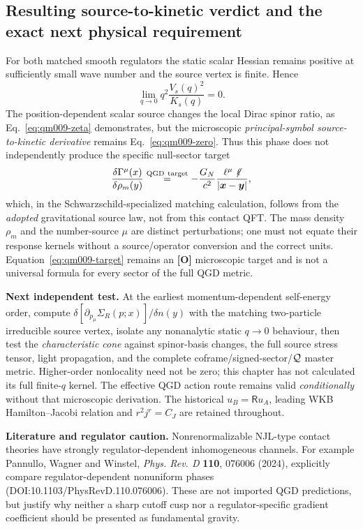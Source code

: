 \documentclass[11pt,a4paper]{article}
\begin{document}
\subsection{Resulting source-to-kinetic verdict and the exact next physical requirement}
For both matched smooth regulators the static scalar Hessian remains positive at sufficiently small wave number and the source vertex is finite. Hence
\begin{equation}\label{eq:qm009-pole}
\boxed{\lim_{q\to0}q^2\frac{V_s(q)^2}{K_s(q)}=0.}
\end{equation}
The position-dependent scalar source changes the local Dirac spinor ratio, as Eq.~\eqref{eq:qm009-zeta} demonstrates, but the microscopic \emph{principal-symbol source-to-kinetic derivative} remains Eq.~\eqref{eq:qm009-zero}. Thus this phase does not independently produce the specific null-sector target
\begin{equation}\label{eq:qm009-target}
\frac{\delta\Gamma^\mu(x)}{\delta\rho_m(y)}\stackrel{\rm QGD\ target}{=}
-\frac{G_N}{c^2}\frac{\ell^\mu\not\!\ell}{|\bm x-\bm y|},
\end{equation}
which, in the Schwarzschild-specialized matching calculation, follows from the \emph{adopted} gravitational source law, not from this contact QFT. The mass density $\rho_m$ and the number-source $\mu$ are distinct perturbations; one must not equate their response kernels without a source/operator conversion and the correct units. Equation~\eqref{eq:qm009-target} remains an \textbf{[O]} microscopic target and is not a universal formula for every sector of the full QGD metric.

\textbf{Next independent test.} At the earliest momentum-dependent self-energy order, compute $\delta[\partial_{p_\mu}\Sigma_R(p;x)]/\delta n(y)$ with the matching two-particle irreducible source vertex, isolate any nonanalytic static $q\to0$ behaviour, then test the \emph{characteristic cone} against spinor-basis changes, the full source stress tensor, light propagation, and the complete coframe/signed-sector/$\mathcal Q$ master metric. Higher-order nonlocality need not be zero; this chapter has not calculated its full finite-$q$ kernel. The effective QGD action route remains valid \emph{conditionally} without that microscopic derivation. The historical $u_B=\mathsf R u_A$, leading WKB Hamilton--Jacobi relation and $r^2j^r=C_J$ are retained throughout.

\textbf{Literature and regulator caution.} Nonrenormalizable NJL-type contact theories have strongly regulator-dependent inhomogeneous channels. For example Pannullo, Wagner and Winstel, \emph{Phys. Rev. D} \textbf{110}, 076006 (2024), explicitly compare regulator-dependent nonuniform phases (DOI:10.1103/PhysRevD.110.076006). These are not imported QGD predictions, but justify why neither a sharp cutoff cusp nor a regulator-specific gradient coefficient should be presented as fundamental gravity.
\end{document}
